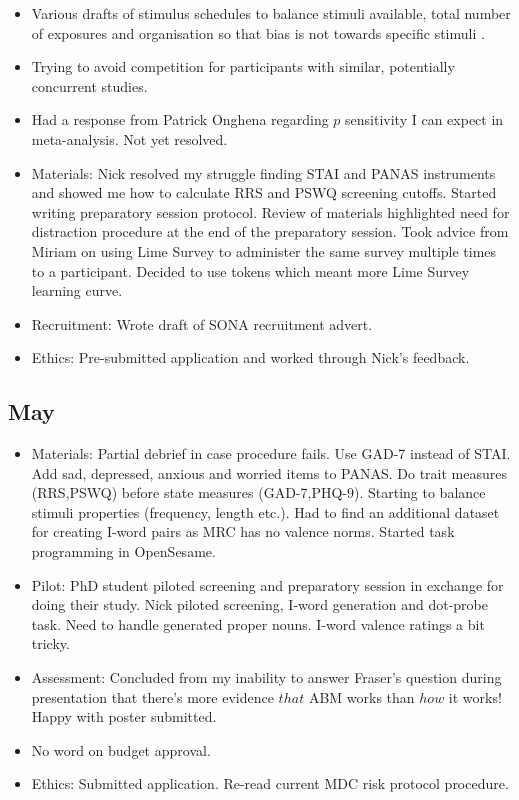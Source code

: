\documentclass[british]{article}
\begin{document}
\begin{itemize}
  \item Various drafts of stimulus schedules to balance stimuli available,
    total number of exposures and organisation so that bias is not towards
    specific stimuli \parencite{see_reduction_2009}. 

  \item Trying to avoid competition for participants with similar, potentially concurrent
    studies.

  \item Had a response from Patrick Onghena regarding ${p}$ sensitivity I can expect
    in meta-analysis. Not yet resolved.

  \item Materials: Nick resolved my struggle finding STAI and PANAS
  instruments and showed me how to calculate RRS and PSWQ screening
  cutoffs. Started writing preparatory session protocol. Review of
  materials highlighted need for distraction procedure at the end of the
  preparatory session. Took advice from Miriam on using Lime Survey to
  administer the same survey multiple times to a participant. Decided
  to use tokens which meant more Lime Survey learning curve.

  \item Recruitment: Wrote draft of SONA recruitment advert.

  \item Ethics: Pre-submitted application and worked through Nick's feedback.
\end{itemize}

\subsection{May}

\begin{itemize}
  \item Materials: Partial debrief in case procedure fails. Use GAD-7
  instead of STAI. Add sad, depressed, anxious and worried items to
  PANAS. Do trait measures (RRS,PSWQ) before state measures (GAD-7,PHQ-9).
  Starting to balance stimuli properties (frequency, length etc.). Had
  to find an additional dataset for creating I-word pairs as MRC has no
  valence norms. Started task programming in OpenSesame.

  \item Pilot: PhD student piloted screening and preparatory session
  in exchange for doing their study. Nick piloted screening, I-word
  generation and dot-probe task. Need to handle generated proper
  nouns. I-word valence ratings a bit tricky.

  \item Assessment: Concluded from my inability to answer Fraser's
  question during presentation that there's more evidence ${that}$ ABM
  works than ${how}$ it works! Happy with poster submitted.

  \item No word on budget approval.

  \item Ethics: Submitted application. Re-read current MDC risk protocol
    procedure.
\end{itemize}
\end{document}
